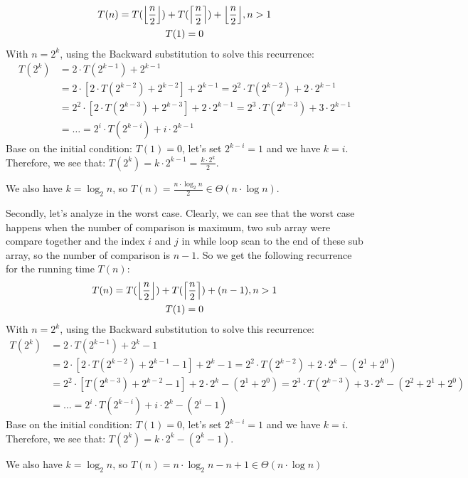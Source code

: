 \documentclass[a4paper]{article}
\DeclarePairedDelimiter\ceil{\lceil}{\rceil}
\DeclarePairedDelimiter\floor{\lfloor}{\rfloor}
\begin{document}
\begin{gather*}
          T(n) = T(\floor* {\frac{n}{2}}) + T(\ceil* {\frac{n}{2}}) + \floor*{\frac{n}{2}}, n > 1 \\ 
                T(1) = 0
\end{gather*}
With $n = 2^k$, using the Backward substitution to solve this recurrence:
\begin{equation*}
  \begin{aligned}
    T(2^k) & = 2 \cdot T(2^{k-1}) + 2^{k-1} \\ 
           & = 2 \cdot [2 \cdot T(2^{k-2}) + 2^{k-2}] + 2^{k-1} = 2^2 \cdot T(2^{k-2}) + 2 \cdot 2^{k-1} \\
           & = 2^2 \cdot [2 \cdot T(2^{k-3}) + 2^{k-3}] + 2 \cdot 2^{k-1} = 2^3 \cdot T(2^{k-3}) + 3 \cdot 2^{k-1} \\ 
           & = \ldots = 2^i \cdot T(2^{k-i}) + i \cdot 2^{k-1}
  \end{aligned}
\end{equation*}
Base on the initial condition: $T(1) = 0$, let's set $2^{k-i} = 1$ and we have $k=i$. Therefore, we see that: $T(2^k) = k \cdot 2^{k-1} = \frac{k \cdot 2^k}{2}$. \par \bigskip
We also have $k = \log_2 n$, so $T(n) = \frac{n \cdot \log_2 n}{2} \in \Theta(n \cdot \log n)$. \par \bigskip
Secondly, let's analyze in the worst case. Clearly, we can see that the worst case happens when the number of comparison is maximum, two sub array were compare together and the index $i$ and $j$ in while loop scan to the end of these sub array, so the number of comparison is $n-1$. So we get the following recurrence for the running time $T(n)$: 
\begin{gather*}
    T(n) = T(\floor* {\frac{n}{2}}) + T(\ceil* {\frac{n}{2}}) + (n-1), n > 1 \\ 
                T(1) = 0
\end{gather*}
With $n = 2^k$, using the Backward substitution to solve this recurrence:
\begin{equation*}
    \begin{aligned}
      T(2^k) & = 2 \cdot T(2^{k-1}) + 2^{k}-1 \\ 
             & = 2 \cdot [2 \cdot T(2^{k-2}) + 2^{k-1}-1] + 2^{k}-1 = 2^2 \cdot T(2^{k-2}) + 2\cdot2^k - (2^1 + 2^0) \\ 
             & = 2^2\cdot[T(2^{k-3})+2^{k-2}-1]+2\cdot2^k-(2^1+2^0) = 2^3\cdot T(2^{k-3}) + 3 \cdot 2^{k}-(2^2+2^1+2^0) \\ 
             & = \ldots = 2^i \cdot T(2^{k-i}) + i \cdot 2^k - (2^i-1) 
    \end{aligned}
\end{equation*}
Base on the initial condition: $T(1) = 0$, let's set $2^{k-i} = 1$ and we have $k=i$. Therefore, we see that: $T(2^k) = k \cdot 2^k - (2^k-1)$. \par \bigskip
We also have $k = \log_2 n$, so $T(n) = n \cdot \log_2n  - n + 1 \in \Theta(n \cdot \log n)$
\end{document}

